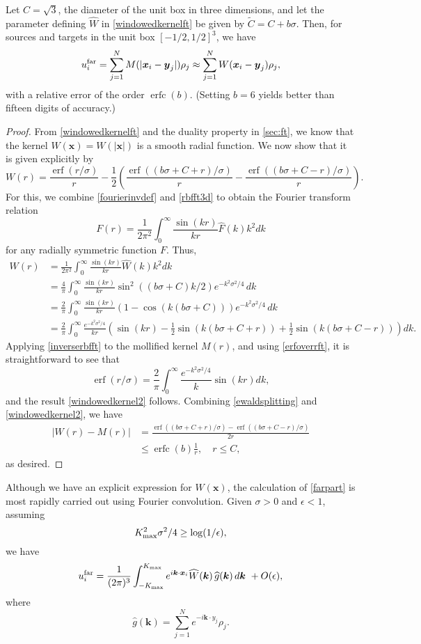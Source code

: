 \documentclass[final,letterpaper]{siamart171218}
\DeclareMathOperator\erf{erf}
\DeclareMathOperator\erfc{erfc}
\newcommand{\be}{\begin{equation}}
\newcommand{\ee}{\end{equation}}
\newcommand{\ba}{\begin{aligned}}
\newcommand{\ea}{\end{aligned}}
\newcommand{\x}{\boldsymbol{x}}
\newcommand{\y}{\boldsymbol{y}}
\newcommand{\bk}{\boldsymbol{k}}
\begin{document}
\begin{lemma}  \label{trunc_lemma}
Let $C = \sqrt{3}$, the diameter of the unit box in three dimensions,
and let the parameter defining $\widehat{W}$ in \eqref{windowedkernelft}
be given by $\tilde{C} = C + b \sigma$. 
Then, for sources and targets in the unit box 
$[-1/2,1/2]^3$, we have
\be\label{farpart}
u_{i}^{\rm far}=\sum_{j=1}^{N}M(|\x_i-\y_j|)\rho_j
\approx \sum_{j=1}^{N}W(\x_i-\y_j)\rho_j,
\ee
with a relative error of the order $\erfc(b)$. (Setting $b=6$ yields better than
fifteen digits of accuracy.) 
\end{lemma}

\begin{proof}
From \eqref{windowedkernelft} and the duality property 
 in
\cref{sec:ft}, we know that the kernel $W(\x) = W(|\x|)$ is a smooth radial
function.  We now show that it is given explicitly by
\be\label{windowedkernel2}
W(r)=
\frac{\erf(r/\sigma)}{r}- \frac{1}{2} 
\left(\frac{\erf((b\sigma+C+r)/\sigma)}{r}-\frac{\erf((b\sigma+C-r)/\sigma)}{r} \right).
\ee
For this, we combine
\eqref{fourierinvdef}
and \eqref{rbfft3d} to obtain
the Fourier transform relation
\be\label{inverserbfft}
F(r)=\frac{1}{2\pi^2}\int_0^\infty \frac{\sin(kr)}{kr}\hat{F}(k)k^2dk
\ee
for any radially symmetric function $F$.
Thus, 
\[
\ba
W(r)&=\frac{1}{2\pi^2}\int_0^\infty \frac{\sin(kr)}{kr}\hat{W}(k)k^2dk\\
&=\frac{4}{\pi}\int_0^\infty \frac{\sin(kr)}{kr}
\sin^2((b\sigma+C)k/2) e^{-k^2 \sigma^2/4} \, dk\\
&=\frac{2}{\pi}\int_0^\infty \frac{\sin(kr)}{kr}
(1-\cos(k(b\sigma+C))) e^{-k^2\sigma^2/4} \, dk\\
&=\frac{2}{\pi}\int_0^\infty \frac{e^{-k^2 \sigma^2/4}}{kr}
(\sin(kr)-\frac{1}{2}\sin(k(b\sigma+C+r))+\frac{1}{2}\sin(k(b\sigma+C-r)))dk.
\ea
\]
Applying \cref{inverserbfft} to the mollified kernel $M(r)$, 
and using \cref{erfoverrft}, it is straightforward to see that
\be
\erf(r/\sigma) = \frac{2}{\pi}\int_0^\infty 
\frac{e^{-k^2 \sigma^2/4}}{k}\sin(kr)dk,
\ee
and the result \eqref{windowedkernel2} follows. 
Combining \cref{ewaldsplitting} and \cref{windowedkernel2}, we have
\be
\ba
\left|W(r)-M(r)\right| &= 
\frac{\erf((b\sigma+C+r)/\sigma)-\erf((b\sigma+C-r)/\sigma)}{2r}\\
&\le \erfc(b) \frac{1}{r}, \quad r\le C,
\ea
\ee
as desired.
\end{proof}

Although we have an explicit expression for $W(\x)$, 
the calculation of \eqref{farpart} is most rapidly carried out using
Fourier convolution. 
Given $\sigma >0$ and $\epsilon < 1$, assuming
\be 
\label{Knodesdef}
K_{\rm max}^2 \sigma^2/4 \geq \log(1/\epsilon),
\ee
 we have
\be
u_{i}^{\rm far} = 
\frac{1}{(2\pi)^3}\int_{-K_{\rm max}}^{K_{\rm max}} e^{i\bk\cdot \x_i}  \widehat{W}(\bk) \,\widehat{g}(\bk) 
\, d\bk \ 
+ O(\epsilon),
\ee
where
\be\label{rhs_trans}
\widehat{g}(\bk)= \sum_{j=1}^{N} e^{-i \bk \cdot y_j} \rho_j.
\ee
\end{document}
